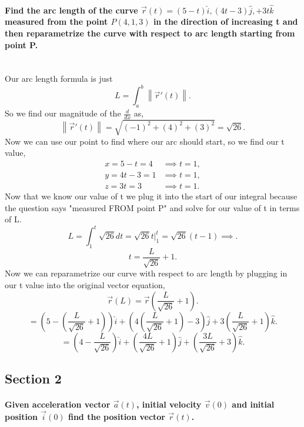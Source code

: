 \documentclass{report}
\begin{document}
\begin{multicols}{2}
\paragraph{Find the arc length of the curve $ \vec{ r }\left( t \right) = \left( 5-t \right) \hat{ i }, \left( 4t-3 \right) \hat{ j }, +3t \hat{k} $ measured from the point $ P\left( 4,1,3 \right)  $ in the direction of increasing t and then reparametrize the curve with respect to arc length starting from point P. \\ \\}
Our arc length formula is just
\begin{equation}
L=\int_{ a }^{ b } \left\| \vec{ r }'\left( t \right)  \right\|
.\end{equation}
So we find our magnitude of the $ \frac{ d }{ dx }  $ as,
\[
\left\| \vec{ r }'\left( t \right)  \right\| = \sqrt{ \left( -1 \right) ^2 + \left( 4 \right) ^2 + \left( 3 \right) ^2 } = \sqrt{ 26 } 
.\] 
Now we can use our point to find where our arc should start, so we find our t value,
\begin{align*}
	x=5-t = 4 &\implies t=1,\\
	y=4t-3 = 1 &\implies t=1,\\
	z=3t=3 &\implies t=1
.\end{align*}
Now that we know our value of t we plug it into the start of our integral because the question says "measured FROM point P" and solve for our value of t in terms of L.
\[
L = \int_{ 1 }^{ t } \sqrt{ 26 } dt = \sqrt{ 26 } t \bigg|_{ 1 }^{ t } = \sqrt{ 26 }\left( t-1 \right) \implies
.\] 
\[
t = \frac{ L }{ \sqrt{ 26 }  } + 1
.\] 
Now we can reparametrize our curve with respect to arc length by plugging in our t value into the original vector equation,
\[
\vec{ r }\left( L \right) = \vec{ r }\left( \frac{ L }{ \sqrt{ 26 } } +1 \right) 
.\] 
\[
= \left( 5 - \left( \frac{ L }{ \sqrt{ 26 } } +1 \right)\right)\hat{i} + \left( 4\left( \frac{ L }{ \sqrt{ 26 } } +1 \right) - 3 \right)\hat{ j } + 3\left( \frac{ L }{ \sqrt{ 26 } } +1 \right) \hat{k}
.\] 
\[
= \left( 4-\frac{ L }{ \sqrt{ 26 }  }  \right) \hat{i} + \left( \frac{ 4L }{ \sqrt{ 26 }  }+1 \right) \hat{j} + \left( \frac{ 3L }{ \sqrt{ 26 }  }+3 \right) \hat{k}
.\] 
\subsection{Section 2}%
\label{sub: Section 2 }
\paragraph{Given acceleration vector $ \vec{ a }\left( t \right)  $, initial velocity $ \vec{ v }\left( 0 \right)  $ and initial position $ \vec{ i }\left( 0 \right)  $ find the position vector $ \vec{ r }\left( t \right)  $. \\}

\end{multicols}
\end{document}
